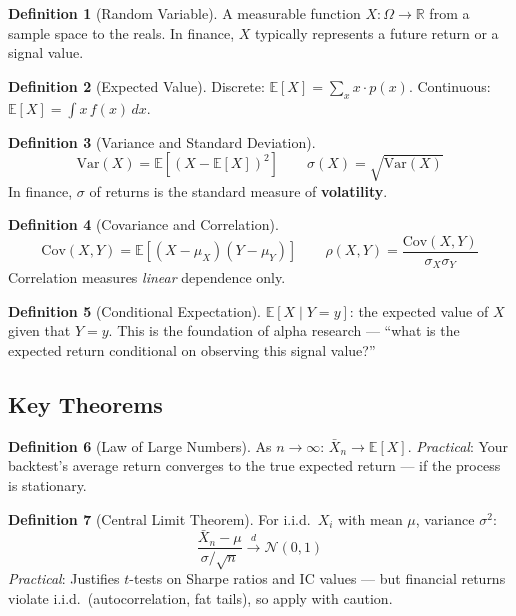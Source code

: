 \documentclass[a4paper, 11pt]{report}
\theoremstyle{definition}
\newtheorem{definition}{Definition}[chapter]
\theoremstyle{remark}
\begin{document}
\begin{definition}[Random Variable]
    A measurable function $X: \Omega \to \mathbb{R}$ from a sample space to the
    reals.  In finance, $X$ typically represents a future return or a signal
    value.
\end{definition}

\begin{definition}[Expected Value]
    Discrete: $\mathbb{E}[X] = \sum_x x \cdot p(x)$.
    Continuous: $\mathbb{E}[X] = \int x \, f(x)\, dx$.
\end{definition}

\begin{definition}[Variance and Standard Deviation]
    \[
        \text{Var}(X) = \mathbb{E}[(X - \mathbb{E}[X])^2]
        \qquad
        \sigma(X) = \sqrt{\text{Var}(X)}
    \]
    In finance, $\sigma$ of returns is the standard measure of
    \textbf{volatility}.
\end{definition}

\begin{definition}[Covariance and Correlation]
    \[
        \text{Cov}(X,Y) = \mathbb{E}[(X-\mu_X)(Y-\mu_Y)]
        \qquad
        \rho(X,Y) = \frac{\text{Cov}(X,Y)}{\sigma_X \sigma_Y}
    \]
    Correlation measures \emph{linear} dependence only.
\end{definition}

\begin{definition}[Conditional Expectation]
    $\mathbb{E}[X \mid Y = y]$: the expected value of $X$ given that $Y = y$.
    This is the foundation of alpha research --- ``what is the expected return
    conditional on observing this signal value?''
\end{definition}

\subsection{Key Theorems}

\begin{definition}[Law of Large Numbers]
    As $n \to \infty$: $\bar{X}_n \to \mathbb{E}[X]$.
    \emph{Practical}: Your backtest's average return converges to the true
    expected return --- if the process is stationary.
\end{definition}

\begin{definition}[Central Limit Theorem]
    For i.i.d.\ $X_i$ with mean $\mu$, variance $\sigma^2$:
    \[
        \frac{\bar{X}_n - \mu}{\sigma/\sqrt{n}} \xrightarrow{d} \mathcal{N}(0,1)
    \]
    \emph{Practical}: Justifies $t$-tests on Sharpe ratios and IC values ---
    but financial returns violate i.i.d.\ (autocorrelation, fat tails), so
    apply with caution.
\end{definition}
\end{document}
